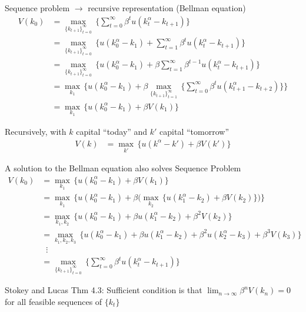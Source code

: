 \documentclass[11pt, aspectratio=169]{beamer}
\newenvironment{witemize}{\itemize\addtolength{\itemsep}{10pt}}{\enditemize}
\begin{document}
\begin{frame}{}
\begin{witemize}
\item Sequence problem $\longrightarrow$ recursive representation (Bellman equation)
\begin{align*}
	V(k_0) &= \max_{ \{ k_{t+1} \}_{t=0}^\infty } \, \bigg\{  \sum_{t = 0}^\infty \beta^t u(k_t^\alpha  - k_{t+1}) \bigg\} \\
	&= \max_{ \{ k_{t+1} \}_{t=0}^\infty } \, \bigg\{ u(k_0^\alpha  - k_1) + \sum_{t = 1}^\infty \beta^t u(k_t^\alpha  - k_{t+1}) \bigg\}  \\
	&= \max_{ \{ k_{t+1} \}_{t=0}^\infty } \, \bigg\{ u(k_0^\alpha  - k_1) + \beta \sum_{t = 1}^\infty \beta^{t-1} u(k_t^\alpha  - k_{t+1}) \bigg\} \\
	&= \max_{k_1} \, \bigg\{ u(k_0^\alpha  - k_1) + \beta \max_{ \{ k_{t+1} \}_{t=1}^\infty } \, \bigg\{  \sum_{t = 0}^\infty \beta^t u(k_{t+1}^\alpha  - k_{t+2}) \bigg\} \bigg\} \\
	&= \max_{ k_1} \, \bigg\{ u(k_0^\alpha  - k_1) + \beta V(k_1) \bigg\}
\end{align*}

\item Recursively, with $k$ capital ``today'' and $k'$ capital ``tomorrow''
\begin{align*}
	V(k) &= \max_{k'} \, \bigg\{ u(k^\alpha  - k') + \beta V(k') \bigg\}
\end{align*}

\end{witemize}
\end{frame}


\begin{frame}{}
\begin{witemize}
\item A solution to the Bellman equation also solves Sequence Problem
\begin{align*}
	V(k_0) &= \max_{ k_1} \, \bigg\{ u(k_0^\alpha  - k_1) + \beta V(k_1) \bigg\} \\
	&= \max_{ k_1} \, \bigg\{ u(k_0^\alpha  - k_1) + \beta \bigg( \max_{ k_2} \, \bigg\{ u(k_1^\alpha  - k_2) + \beta V(k_2) \bigg\} \bigg) \bigg\} \\
	&= \max_{ k_1, k_2} \, \bigg\{ u(k_0^\alpha  - k_1) + \beta u(k_1^\alpha  - k_2) + \beta^2 V(k_2) \bigg\} \\
	&= \max_{ k_1, k_2, k_3} \, \bigg\{ u(k_0^\alpha  - k_1) + \beta u(k_1^\alpha  - k_2) + \beta^2 u(k_2^\alpha  - k_3) + \beta^3 V(k_3) \bigg\} \\
	&\;\; \vdots \\
	&= \max_{ \{ k_{t+1} \}_{t=0}^\infty } \, \bigg\{  \sum_{t = 0}^\infty \beta^t u(k_t^\alpha  - k_{t+1}) \bigg\} 
\end{align*}

\item Stokey and Lucas Thm 4.3: Sufficient condition is that $\lim_{n \to \infty} \beta^n V(k_n) = 0$ for all feasible sequences of $\{ k_t \}$ 

\end{witemize}
\end{frame}
\end{document}
